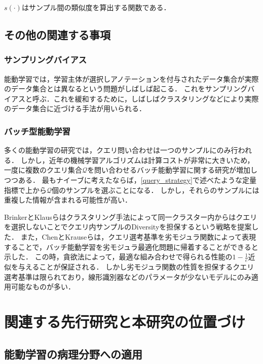 $s(\cdot)$はサンプル間の類似度を算出する関数である．

\subsection{その他の関連する事項}
\subsubsection{サンプリングバイアス}
能動学習では，学習主体が選択しアノテーションを付与されたデータ集合が実際のデータ集合とは異なるという問題がしばしば起こる．
これをサンプリングバイアスと呼ぶ．これを緩和するために，しばしばクラスタリングなどにより実際のデータ集合に近づける手法が用いられる．

\subsubsection{バッチ型能動学習}
多くの能動学習の研究では，クエリ問い合わせは一つのサンプルにのみ行われる．
しかし，近年の機械学習アルゴリズムは計算コストが非常に大きいため，一度に複数のクエリ集合$\mathcal{Q}$を問い合わせるバッチ能動学習に関する研究が増加しつつある．
最もナイーブに考えたならば，\ref{query_strategy}で述べたような定量指標で上から$\mathcal{Q}$個のサンプルを選ぶことになる．
しかし，それらのサンプルには重複した情報が含まれる可能性が高い．

BrinkerとKlausらはクラスタリング手法によって同一クラスター内からはクエリを選択しないことでクエリ内サンプルのDiversityを担保するという戦略を提案した\cite{brinker2003incorporating}．
また，ChenとKrauseらは，クエリ選考基準を劣モジュラ関数によって表現することで，バッチ能動学習を劣モジュラ最適化問題に帰着することができると示した\cite{chen2013near}．
この時，貪欲法によって，最適な組み合わせで得られる性能の$1 - \frac{1}{e}$近似を与えることが保証される．
しかし劣モジュラ関数の性質を担保するクエリ選考基準は限られており，線形識別器などのパラメータが少ないモデルにのみ適用可能なものが多い．

\section{関連する先行研究と本研究の位置づけ}

\subsection{能動学習の病理分野への適用}

